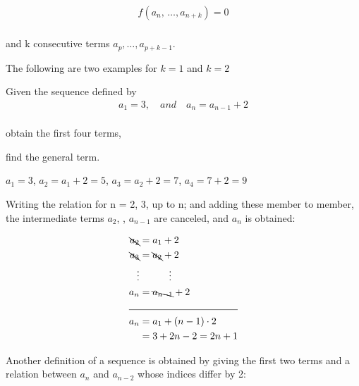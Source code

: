\documentclass[11pt]{amsbook}
\begin{document}
\begin{align*}
	f(a_{n},\, \dotso , a_{n+k}) = 0\\
\end{align*}

\noindent and k consecutive terms $a_{p} , \dotso  , a_{p+k-1}$.\\

\par
The following are two examples for $k = 1$ and $k = 2$\\


\begin{exmp} 
	Given the sequence defined by\\
	\begin{align*}
		a_{1} = 3, \quad and\quad a_{n} = a_{n-1} + 2\\
	\end{align*}
	\begin{hEnumerateAlpha}
		\item obtain the first four terms,\\
		\item find the general term.\\
	\end{hEnumerateAlpha}
	\begin{hSolution}
		\begin{hEnumerateAlpha}
			\item $a_1 = 3$, $a_2 = a_1+2 = 5$, $a_3 = a_2 + 2 =7$, $a_4 = 7 + 2 = 9$ \\
			\item Writing the relation for n = 2, 3, \dotso up to n; and adding these member to member, the intermediate terms $a_2$, \dotso , $a_{n-1}$ are canceled, and $a_n$  is obtained:\\
		\end{hEnumerateAlpha}
		\begin{align*}
			\bcancel{ a_{2}} &= a_1 + 2\\
			\bcancel{ a_{3}} &= \bcancel{ a_{2}} + 2\\
			\vdots &\qquad \quad \vdots \\
			a_{n} &= \bcancel{ a_{n-1}} + 2\\
			\cline{1-2}
			a_n &= a_1 + (n-1)\cdot 2\\
			&= 3 + 2n - 2 = 2n+1
		\end{align*}
	


Another definition of a sequence is obtained by giving the first two terms and a relation between $a_n$ and $a_{n-2}$ whose indices differ by 2:
\end{hSolution}
\end{exmp}
\end{document}
